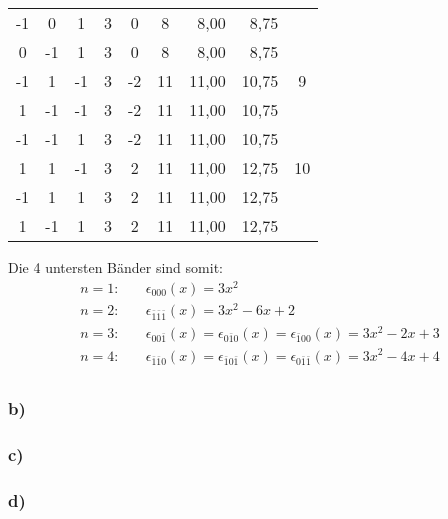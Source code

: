 \begin{table}[htbp]
\begin{center}
\begin{tabular}{|c|c|c|c|c|c|r|r|c|}
-1 & 0 & 1 & 3 & 0 & 8 & 8,00 & 8,75 & \multicolumn{ 1}{c|}{} \\ \cline{ 1- 8}
0 & -1 & 1 & 3 & 0 & 8 & 8,00 & 8,75 & \multicolumn{ 1}{c|}{} \\ \hline
-1 & 1 & -1 & 3 & -2 & 11 & 11,00 & 10,75 & \multicolumn{ 1}{c|}{9} \\ \cline{ 1- 8}
1 & -1 & -1 & 3 & -2 & 11 & 11,00 & 10,75 & \multicolumn{ 1}{c|}{} \\ \cline{ 1- 8}
-1 & -1 & 1 & 3 & -2 & 11 & 11,00 & 10,75 & \multicolumn{ 1}{c|}{} \\ \hline
1 & 1 & -1 & 3 & 2 & 11 & 11,00 & 12,75 & \multicolumn{ 1}{c|}{10} \\ \cline{ 1- 8}
-1 & 1 & 1 & 3 & 2 & 11 & 11,00 & 12,75 & \multicolumn{ 1}{c|}{} \\ \cline{ 1- 8}
1 & -1 & 1 & 3 & 2 & 11 & 11,00 & 12,75 & \multicolumn{ 1}{c|}{} \\ \hline
\end{tabular}
\end{center}
\label{tab1}
\end{table}

Die 4 untersten Bänder sind somit:
\begin{align*}
n = 1:\quad & \epsilon_{000}(x) = 3 x^2 \\
n = 2:\quad & \epsilon_{\bar1\bar1\bar1}(x) =  3 x^2 - 6 x + 2\\
n = 3:\quad & \epsilon_{00\bar1}(x) = \epsilon_{0\bar10}(x) = \epsilon_{\bar100}(x)  =  3 x^2  - 2 x + 3\\
n = 4:\quad & \epsilon_{\bar1\bar10}(x) = \epsilon_{\bar10\bar1}(x) = \epsilon_{0\bar1\bar1}(x) = 3 x^2 - 4 x + 4\\
\end{align*}

\subsubsection*{b)}

\subsubsection*{c)}

\subsubsection*{d)}

